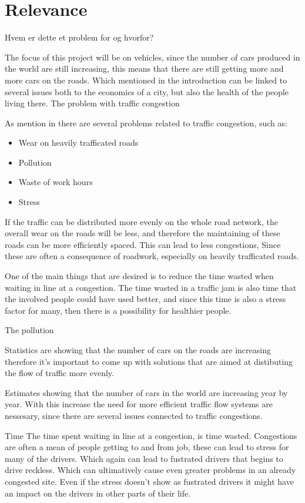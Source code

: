 \section{Relevance}
Hvem er dette et problem for og hvorfor?

The focus of this project will be on vehicles, since the number of cars produced in the world are still increasing, this means that there are still getting more and more cars on the roads. Which mentioned in the introduction can be linked to several issues both to the economics of a city, but also the health of the people living there.
The problem with traffic congestion 

As mention in  there are several problems related to traffic congestion, such as:
\begin{itemize}
	\item Wear on heavily trafficated roads
	\item Pollution
	\item Waste of work hours
	\item Stress
\end{itemize}

If the traffic can be distributed more evenly on the whole road network, the overall wear on the roads will be less, and therefore the maintaining of these roads can be more efficiently spaced. This can lead to less congestions, Since these are often a consequence of roadwork, especially on heavily trafficated roads.

One of the main things that are desired is to reduce the time wasted when waiting in line at a congestion.
The time wasted in a traffic jam is also time that the involved people could have used better, and since this time is also a stress factor for many, then there is a possibility for healthier people. 

The pollution 




Statistics are showing that the number of cars on the roads are increasing therefore it's important to come up with solutions that are aimed at distibuting the flow of traffic more evenly.

Estimates showing that the number of cars in the world are increasing year by year.\cite{http://wardsauto.com/ar/world_vehicle_population_110815} With this increase the need for more efficient traffic flow systems are nessesary, since there are several issues connected to traffic congestions.

Time
The time spent waiting in line at a congestion, is time wasted. Congestions are often a mean of people getting to and from job, these can lead to stress for many of the drivers.\cite{stress,http://psycnet.apa.org/journals/apl/63/4/467.pdf} Which again can lead to fustrated drivers that begins to drive reckless.\cite{http://www.sciencedirect.com/science/article/pii/S1369847899000029} Which can ultimatively cause even greater problems in an already congested site. Even if the stress doesn't show as fustrated drivers it might have an impact on the drivers in other parts of their life.